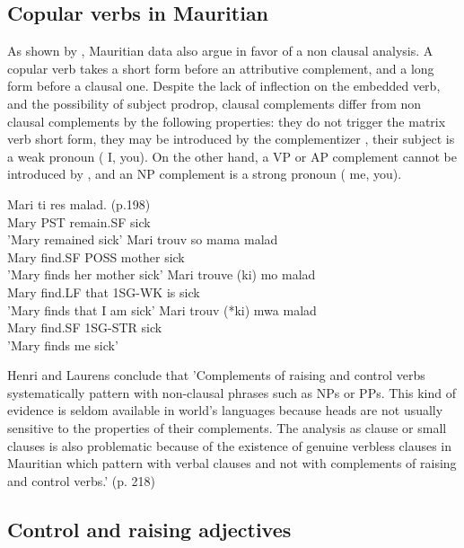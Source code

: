 \documentclass[output=paper]{langsci/langscibook}
\begin{document}
\subsection{Copular verbs in Mauritian}

As shown by \citet{HenriandLaurens2011}, Mauritian data also argue in favor of a non clausal analysis. A copular verb takes a short form before an attributive complement, and a long form before a clausal one. Despite the lack of inflection on the embedded verb, and the possibility of subject prodrop,  clausal complements differ from non clausal complements by the following properties: they do not trigger the matrix verb short form, they may be introduced by the complementizer , their subject is a weak pronoun ( I, you). On the other hand, a VP or AP complement cannot be introduced by , and an NP complement is a strong pronoun ( me, you).

\begin{exe}
\ex \begin{xlist}
\ex \gll Mari ti res  malad. (p.198)\\
Mary PST remain.SF sick\\
\glt 'Mary remained sick'
\ex \gll Mari trouv  so mama malad\\
Mary find.SF POSS mother sick\\
\glt 'Mary finds her mother sick'
\ex \gll Mari trouve (ki) mo malad\\
Mary find.LF that 1SG-WK is sick\\
\glt 'Mary finds that I am sick'
\ex \gll Mari trouv (*ki) mwa malad\\
Mary find.SF 1SG-STR sick\\
\glt 'Mary finds me sick'
\end{xlist}
\end{exe}

Henri and Laurens conclude that 'Complements of raising and control verbs systematically pattern with non-clausal phrases such as NPs or PPs. This kind of evidence is seldom available in world’s languages because heads are not usually sensitive to the properties of their complements. The analysis as clause or small clauses is also problematic because of the existence of genuine verbless clauses in Mauritian which pattern with verbal clauses and not with complements of raising and control verbs.' (p. 218)

\subsection{Control and raising adjectives}
\end{document}
